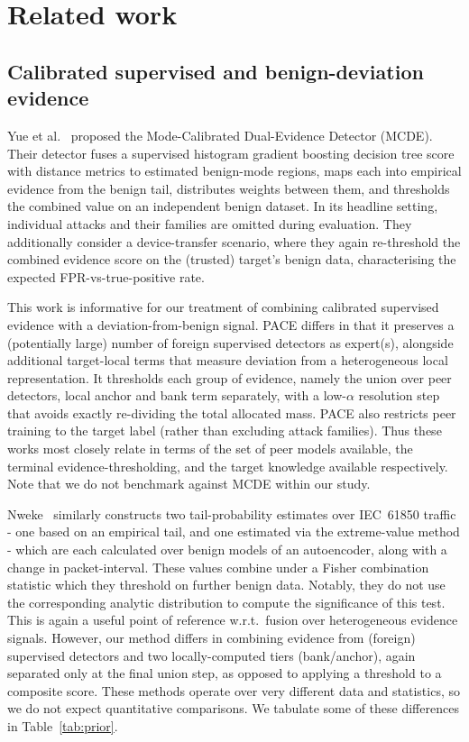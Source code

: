 \section{Related work} 
\label{sec:related} 
\subsection{Calibrated supervised and benign-deviation evidence} 
Yue et al.~\cite{yue2026mcde} proposed the Mode-Calibrated Dual-Evidence Detector (MCDE). Their detector fuses a supervised histogram gradient boosting decision tree score with distance metrics to estimated benign-mode regions, maps each into empirical evidence from the benign tail, distributes weights between them, and thresholds the combined value on an independent benign dataset. In its headline setting, individual attacks and their families are omitted during evaluation. They additionally consider a device-transfer scenario, where they again re-threshold the combined evidence score on the (trusted) target's benign data, characterising the expected FPR-vs-true-positive rate.

This work is informative for our treatment of combining calibrated supervised evidence with a deviation-from-benign signal. PACE differs in that it preserves a (potentially large) number of foreign supervised detectors as expert(s), alongside additional target-local terms that measure deviation from a heterogeneous local representation. It thresholds each group of evidence, namely the union over peer detectors, local anchor and bank term separately, with a low-$\alpha$ resolution step that avoids exactly re-dividing the total allocated mass. PACE also restricts peer training to the target label (rather than excluding attack families). Thus these works most closely relate in terms of the set of peer models available, the terminal evidence-thresholding, and the target knowledge available respectively. Note that we do not benchmark against MCDE within our study.

Nweke~\cite{nweke2026tail} similarly constructs two tail-probability estimates over IEC~61850 traffic - one based on an empirical tail, and one estimated via the extreme-value method - which are each calculated over benign models of an autoencoder, along with a change in packet-interval. These values combine under a Fisher combination statistic which they threshold on further benign data. Notably, they do not use the corresponding analytic distribution to compute the significance of this test. This is again a useful point of reference w.r.t.~fusion over heterogeneous evidence signals. However, our method differs in combining evidence from (foreign) supervised detectors and two locally-computed tiers (bank/anchor), again separated only at the final union step, as opposed to applying a threshold to a composite score. These methods operate over very different data and statistics, so we do not expect quantitative comparisons. We tabulate some of these differences in Table~\ref{tab:prior}.
 

